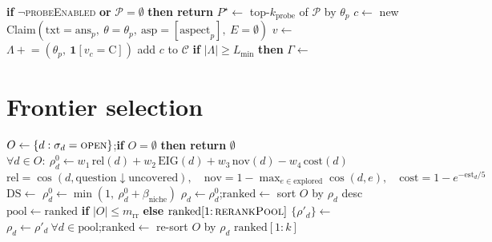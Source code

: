 \documentclass[11pt]{article}
\newcommand{\Claims}{\mathcal{C}}
\newcommand{\Priors}{\mathcal{P}}
\newcommand{\Labels}{\Lambda}
\newcommand{\grad}{g}
\newcommand{\indic}[1]{\mathbf{1}\!\left[#1\right]}
\begin{document}
\begin{algorithm}[H]
\caption{\textsc{PriorProbe} — verify priors up front to seed the calibrator (Component G)}\label{alg:probe}
\begin{algorithmic}[1]
\State \textbf{if} $\neg$\textsc{probeEnabled} \textbf{or} $\Priors=\emptyset$ \textbf{then return}
\State $P^\star\gets$ top-$k_{\mathrm{probe}}$ of $\Priors$ by $\theta_p$
   \State $c\gets$ new Claim$(\mathrm{txt}=\mathrm{ans}_p,\ \theta=\theta_p,\ \mathrm{asp}=[\mathrm{aspect}_p],\ E=\emptyset)$
   \State $v\gets$  
   \State {}
    \State $\Labels\mathrel{+}=(\theta_p,\ \indic{v_c=\mathrm{C}})$ \EndIf {}
   \If{$v_c=\mathrm{C}\ \wedge\ \grad(c)$} \State add $c$ to $\Claims$ \EndIf {}
\EndFor
\State \textbf{if} $|\Labels|\ge L_{\min}$ \textbf{then} $\Gamma\gets$\Call{FitCalibrator}{$\Labels$}
\end{algorithmic}
\end{algorithm}

\section{Frontier selection}

\begin{algorithm}[H]
\caption{\textsc{SelectBatch}$(k)$ — best-first frontier with hierarchy boost and LLM rerank}\label{alg:frontier}
\begin{algorithmic}[1]
\State $O\gets\{d:\sigma_d=\textsc{open}\}$;\quad \textbf{if} $O=\emptyset$ \textbf{then return} $\emptyset$
\State $\forall d\in O:\ \rho_d^{0}\gets w_1\,\mathrm{rel}(d)+w_2\,\mathrm{EIG}(d)+w_3\,\mathrm{nov}(d)-w_4\,\mathrm{cost}(d)$ 
\Statex \hfill$\mathrm{rel}=\cos(d,\text{question}\!\downarrow\!\text{uncovered}),\quad \mathrm{nov}=1-\max_{e\in\text{explored}}\cos(d,e),\quad \mathrm{cost}=1-e^{-\mathrm{est}_d/5}$
\State $\mathrm{DS}\gets$  
   \State $\rho_d^{0}\gets\min(1,\ \rho_d^{0}+\beta_{\mathrm{niche}})$ 
\EndFor
\State $\rho_d\gets\rho_d^{0}$;\quad $\mathrm{ranked}\gets$ sort $O$ by $\rho_d$ desc
   \State $\mathrm{pool}\gets \mathrm{ranked}$ \textbf{if} $|O|\le m_{\mathrm{rr}}$ \textbf{else} $\mathrm{ranked}[1{:}\,\textsc{rerankPool}]$
   \State $\{\rho'_d\}\gets$  
   \State $\rho_d\gets\rho'_d\ \forall d\in\mathrm{pool}$;\quad $\mathrm{ranked}\gets$ re-sort $O$ by $\rho_d$
\EndIf
\State \Return $\mathrm{ranked}[1{:}k]$
\end{algorithmic}
\end{algorithm}
\end{document}
